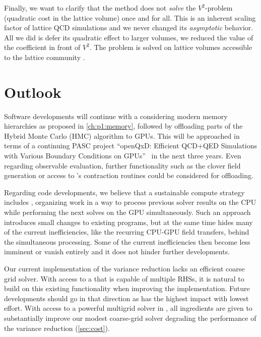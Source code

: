 Finally, we want to clarify that the method does not \emph{solve} the $V^{2}$-problem (quadratic cost in the lattice volume) once and for all.
This is an inherent scaling factor of lattice QCD simulations and we never changed its \emph{asymptotic} behavior.
All we did is defer its quadratic effect to larger volumes, \ie we reduced the value of the coefficient in front of $V^{2}$.
The problem is solved on lattice volumes accessible to the lattice community .

\section{Outlook}

Software developments will continue with a  considering modern memory hierarchies as proposed in \cref{ch:p1:memory}, followed by offloading parts of the Hybrid Monte Carlo (HMC) algorithm to GPUs.
This will be approached in terms of a continuing PASC project ``openQxD: Efficient QCD+QED Simulations with Various Boundary Conditions on GPUs''~\cite{online:pasc2025} in the next three years.
Even regarding observable evaluation, further functionality such as the  clover field generation or access to \quda's contraction routines could be considered for offloading.

Regarding code developments, we believe that a sustainable compute strategy includes , organizing work in a way to process previous solver results on the CPU while performing the next solves on the GPU simultaneously.
Such an approach introduces small changes to existing programs, but at the same time hides many of the current inefficiencies, like the recurring CPU-GPU field transfers, behind the simultaneous processing.
Some of the current inefficiencies then become less imminent or vanish entirely and it does not hinder further developments.


Our current implementation of the variance reduction lacks an efficient coarse grid solver.
With access to a  that is capable of multiple RHSs, it is natural to build on this existing functionality when improving the implementation.
Future developments should go in that direction as has the highest impact with lowest effort.
With access to a powerful multigrid solver in \quda, all ingredients are given to substantially improve our modest coarse-grid solver degrading the performance of the variance reduction (\cref{sec:cost}).


